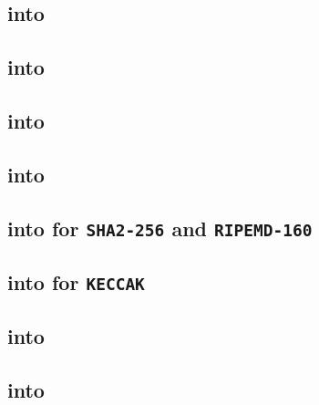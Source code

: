 \subsection{\mmioMod{} into \mmuMod{}}                                                     \label{mmio: lookups: mmu}                         
\subsection{\mmioMod{} into \blkMdxMod{}}                                                  \label{mmio: lookups: blakemodexp}                 
\subsection{\mmioMod{} into \ecDataMod{}}                                                  \label{mmio: lookups: ecdata}                      
\subsection{\mmioMod{} into \logDataMod{}}                                                 \label{mmio: lookups: log}                         
\subsection{\mmioMod{} into \shakiraMod{} for \texttt{SHA2-256} and \texttt{RIPEMD-160}}   \label{mmio: lookups: shakira for sha2 and ripe}   
\subsection{\mmioMod{} into \shakiraMod{} for \texttt{KECCAK}}                             \label{mmio: lookups: shakira for keccak}          
\subsection{\mmioMod{} into \romMod{}}                                                     \label{mmio: lookups: rom}                         
\subsection{\mmioMod{} into \rlpTxnMod{}}                                                  \label{mmio: lookups: txcd}                        

